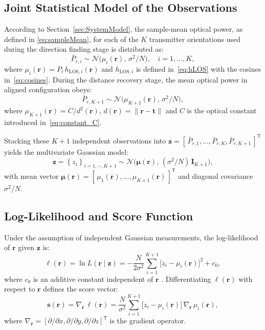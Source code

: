 \documentclass[journal]{IEEEtran}
\newcommand{\deleted}[1]{{\color{red}#1}}
\begin{document}
\deleted{\subsection{Joint Statistical Model of the Observations}

According to Section~\ref{sec:SystemModel}, the sample-mean optical power, as defined in \eqref{eq:sampleMean}, for each of the $K$ transmitter orientations used during the direction finding stage is distributed as:
\begin{equation}
\bar P_{r,i} \sim 
  \mathcal{N}\!\bigl(\mu_{i}(\mathbf r),\,\sigma^{2}/N\bigr),
\quad
i=1,\dots,K,
\end{equation}
where 
$\mu_{i}(\mathbf r)=P_{t}\,h_{\mathrm{LOS},i}(\mathbf r)$
and $h_{\mathrm{LOS},i}$ is defined in~\eqref{eq:hLOS} with the
cosines in~\eqref{eq:cosines}.  
During the distance recovery stage, the mean optical power in aligned configuration obeys:
\begin{equation}
\bar P_{r,K+1}\sim
  \mathcal{N}\!\bigl( \mu_{K+1}(\mathbf{r}) ,\,\sigma^{2}/N\bigr),
\end{equation}
where $\mu_{K+1}(\mathbf{r})=C/d^{2}(\mathbf r)$, $d(\mathbf r)=\lVert\mathbf r-\mathbf t\rVert$ and $C$ is the optical constant introduced in~\eqref{eq:constant_C}.

Stacking these $K+1$ independent observations into
$\mathbf{z}=[\,\bar P_{r,1},\dots,\bar P_{r,K},\bar P_{r,K+1}\,]^{\mathsf T}$
yields the multivariate Gaussian model:
\begin{equation}
\mathbf{z}=\left\{z_i\right\}_{i=1,\cdots,K+1}\sim
\mathcal{N}\!\bigl(\boldsymbol\mu(\mathbf r),\,(\sigma^{2}/N)\,\mathbf{I}_{K+1}\bigr),
\end{equation}
with mean vector
$\boldsymbol\mu(\mathbf r)=[\,\mu_{1}(\mathbf r),\dots,\mu_{K+1}(\mathbf r)\,]^{\mathsf T}$
and diagonal covariance $\sigma^{2}/N$.}

\deleted{\subsection{Log-Likelihood and Score Function}

Under the assumption of independent Gaussian measurements, the log-likelihood
of $\mathbf{r}$ given $\mathbf{z}$ is:
\begin{equation}
\ell(\mathbf r)
= \ln L(\mathbf r\mid\mathbf{z})
= -\frac{N}{2\sigma^{2}}
  \sum_{i=1}^{K+1}
    \bigl[z_{i}-\mu_{i}(\mathbf r)\bigr]^{2}
  + c_0,
\end{equation}
where $c_0$ is an additive constant independent of $\mathbf r$ \cite{Bishop2006}.
Differentiating $\ell(\mathbf r)$ with respect to $\mathbf{r}$ defines the
score vector:
\begin{equation}
\mathbf{s}(\mathbf{r})
= \nabla_{\mathbf{r}}\,\ell(\mathbf{r})
= \frac{N}{\sigma^{2}}
  \sum_{i=1}^{K+1}
    \bigl[z_{i}-\mu_{i}(\mathbf{r})\bigr]\,
    \nabla_{\mathbf{r}}\,\mu_{i}(\mathbf{r}),
\end{equation}
where $\nabla_{\mathbf{r}}=[\partial/\partial x,\partial/\partial y,\partial/\partial z]^{\mathsf T}$ is the gradient operator.}
\end{document}
